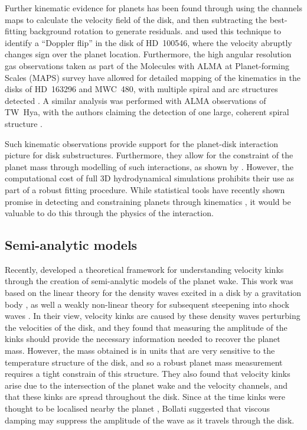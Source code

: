 Further kinematic evidence for planets has been found through using the channels maps to calculate the velocity field of the disk, and then subtracting the best-fitting background rotation to generate residuals.
\citet{casassus2019} and \citet{perez2020} used this technique to identify a ``Doppler flip'' in the disk of HD~100546, where the velocity abruptly changes sign over the planet location.
Furthermore, the high angular resolution gas observations taken as part of the Molecules with ALMA at Planet-forming Scales (MAPS) survey have allowed for detailed mapping of the kinematics in the disks of HD~163296 and MWC~480, with multiple spiral and arc structures detected \citep{teague2021}.
A similar analysis was performed with ALMA observations of TW~Hya, with the authors claiming the detection of one large, coherent spiral structure \citep{teague2022}.

Such kinematic observations provide support for the planet-disk interaction picture for disk substructures. Furthermore, they allow for the constraint of the planet mass through modelling of such interactions, as shown by \citet{pinte2018a,pinte2019}.
However, the computational cost of full 3D hydrodynamical simulations prohibits their use as part of a robust fitting procedure.
While statistical tools have recently shown promise in detecting and constraining planets through kinematics \citep{izquierdo2021,izquierdo2022}, it would be valuable to do this through the physics of the interaction.

\subsection{Semi-analytic models}

Recently, \citet{bollati2021} developed a theoretical framework for understanding velocity kinks through the creation of semi-analytic models of the planet wake.
This work was based on the linear theory for the density waves excited in a disk by a gravitation body \citep{goldreich1980}, as well a weakly non-linear theory for subsequent steepening into shock waves \citep{goodman2001,rafikov2002a}.
In their view, velocity kinks are caused by these density waves perturbing the velocities of the disk, and they found that measuring the amplitude of the kinks should provide the necessary information needed to recover the planet mass.
However, the mass obtained is in units that are very sensitive to the temperature structure of the disk, and so a robust planet mass measurement requires a tight constrain of this structure.
They also found that velocity kinks arise due to the intersection of the planet wake and the velocity channels, and that these kinks are spread throughout the disk.
Since at the time kinks were thought to be localised nearby the planet \citep{pinte2018a,pinte2019,pinte2020}, Bollati suggested that viscous damping may suppress the amplitude of the wave as it travels through the disk.

